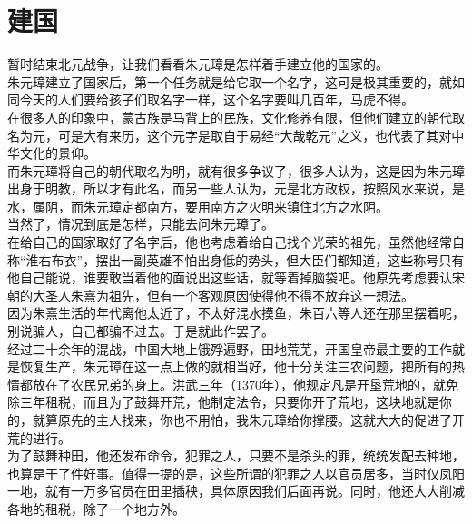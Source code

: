 \section{建国}
\ifnum{}
	\begin{multicols}{\theparacolNo}
\fi
暂时结束北元战争，让我们看看朱元璋是怎样着手建立他的国家的。\\

朱元璋建立了国家后，第一个任务就是给它取一个名字，这可是极其重要的，就如同今天的人们要给孩子们取名字一样，这个名字要叫几百年，马虎不得。\\

在很多人的印象中，蒙古族是马背上的民族，文化修养有限，但他们建立的朝代取名为元，可是大有来历，这个元字是取自于易经“大哉乾元”之义，也代表了其对中华文化的景仰。\\

而朱元璋将自己的朝代取名为明，就有很多争议了，很多人认为，这是因为朱元璋出身于明教，所以才有此名，而另一些人认为，元是北方政权，按照风水来说，是水，属阴，而朱元璋定都南方，要用南方之火明来镇住北方之水阴。\\

当然了，情况到底是怎样，只能去问朱元璋了。\\

在给自己的国家取好了名字后，他也考虑着给自己找个光荣的祖先，虽然他经常自称“淮右布衣”，摆出一副英雄不怕出身低的势头，但大臣们都知道，这些称号只有他自己能说，谁要敢当着他的面说出这些话，就等着掉脑袋吧。他原先考虑要认宋朝的大圣人朱熹为祖先，但有一个客观原因使得他不得不放弃这一想法。\\

因为朱熹生活的年代离他太近了，不太好混水摸鱼，朱百六等人还在那里摆着呢，别说骗人，自己都骗不过去。于是就此作罢了。\\

经过二十余年的混战，中国大地上饿殍遍野，田地荒芜，开国皇帝最主要的工作就是恢复生产，朱元璋在这一点上做的就相当好，他十分关注三农问题，把所有的热情都放在了农民兄弟的身上。洪武三年（1370年），他规定凡是开垦荒地的，就免除三年租税，而且为了鼓舞开荒，他制定法令，只要你开了荒地，这块地就是你的，就算原先的主人找来，你也不用怕，我朱元璋给你撑腰。这就大大的促进了开荒的进行。\\

为了鼓舞种田，他还发布命令，犯罪之人，只要不是杀头的罪，统统发配去种地，也算是干了件好事。值得一提的是，这些所谓的犯罪之人以官员居多，当时仅凤阳一地，就有一万多官员在田里插秧，具体原因我们后面再说。同时，他还大大削减各地的租税，除了一个地方外。\\


\end{multicols}
